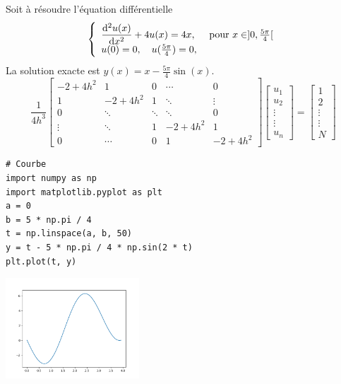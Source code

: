 \documentclass{beamer}
\def \de {{\rm d}}
\begin{document}
\begin{frame} 
Soit à résoudre l'équation différentielle
\begin{equation}
\left\{\begin{array}{l}
{\displaystyle \frac{\de^2 u(x)}{\de x^2}}+4 u(x) =4x, \quad \mbox{ pour }x\in ]0,\frac{5\pi}{4}[ \\
u(0)=0,\quad u(\frac{5\pi}{4})=0,
\end{array}\right.
\end{equation}
La solution exacte est $y(x)=x-\frac{5\pi}{4}\sin(x)$.
 \[\frac{1}{4h^3}
\left[\begin{array}{ccccc}
-2+4h^2&1&0&\cdots&0\\
1&-2+4h^2&1&\ddots&\vdots\\
0&  \ddots &\ddots&\ddots&0\\
\vdots &\ddots &1&-2+4h^2&1\\
   0&\cdots &0&1 &-2+4h^2
\end{array}\right]
\left[\begin{array}{c}
u_1\\u_2\\ \vdots \\ \vdots  \\ u_n
\end{array}\right]=\left[\begin{array}{c}
1\\2\\ \vdots \\ \vdots  \\ N
\end{array}\right]
\] 
\end{frame}
\begin{frame}[fragile] 
\begin{lstlisting}
# Courbe
import numpy as np
import matplotlib.pyplot as plt
a = 0
b = 5 * np.pi / 4
t = np.linspace(a, b, 50)
y = t - 5 * np.pi / 4 * np.sin(2 * t)
plt.plot(t, y)
\end{lstlisting}
 
 \begin{center}
\includegraphics[width=5cm]{courbe.png}
\end{center}
 \end{frame}
 
\end{document}

